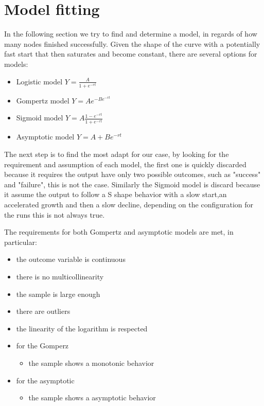 \section{Model fitting}
In the following section we try to find and determine a model, in regards of how many nodes finished successfully. Given the shape of the curve with a potentially fast start that then saturates and become constant, there are several options for models:
\begin{itemize}
	\item Logistic model $ Y = \frac{A}{1 + e^{-rt}} $
	\item Gompertz model $ Y = Ae^{-Be^{-rt}} $
	\item Sigmoid model $ Y = A\frac{1-e^{-rt}}{1+e^{-rt}}$
	\item Asymptotic model $ Y = A + Be^{-rt}$
\end{itemize} 

The next step is to find the most adapt for our case, by looking for the requirement and assumption of each model, the first one is quickly discarded because it requires the output have only two possible outcomes, such as "success" and "failure", this is not the case.
Similarly the Sigmoid model is discard because it assume the output to follow a S shape behavior with a slow start,an accelerated growth and then a slow decline, depending on the configuration for the runs this is not always true.

The requirements for both Gompertz and asymptotic models are met, in particular:
\begin{itemize}
	\item the outcome variable is continuous
	\item there is no multicollinearity
	\item the sample is large enough
	\item there are outliers
	\item the linearity of the logarithm is respected
	
	\item for the Gomperz
		\begin{itemize}
			\item the sample shows a monotonic behavior
		\end{itemize}
		\item for the asymptotic
		\begin{itemize}
			\item the sample shows a asymptotic behavior
		\end{itemize}
\end{itemize}

